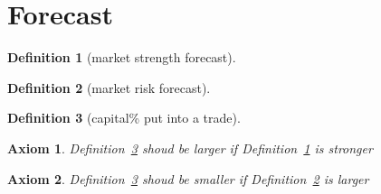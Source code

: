 \documentclass{article}
\newtheorem{definition}{Definition}[section]
\newtheorem{axiom}{Axiom}[section]
\begin{document}
\section{Forecast}
\begin{definition}[market strength forecast]
    \label{msf}
\end{definition}
\begin{definition}[market risk forecast]
    \label{mrf}
\end{definition}
\begin{definition}[capital\% put into a trade]
    \label{cpit}
\end{definition}
\begin{axiom}
    Definition~\ref{cpit} shoud be larger if Definition~\ref{msf} is stronger
\end{axiom}
\begin{axiom}
    Definition~\ref{cpit} shoud be smaller if Definition~\ref{mrf} is larger
\end{axiom}
\end{document}
